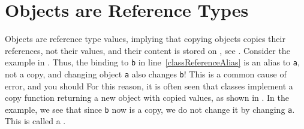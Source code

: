 \documentclass[fsharpNotes.tex]{subfiles}
\begin{document}

\clearpage

\section{Objects are Reference Types}
Objects are reference type values, implying that copying objects copies their references, not their values, and their content is stored on , see . Consider the example in .
 Thus, the binding to \lstinline{b} in line~\ref{classReferenceAlias} is an alias to \lstinline{a}, not a copy, and changing object \lstinline{a} also changes \lstinline{b}! This is a common cause of error, and you should  For this reason, it is often seen that classes implement a copy function returning a new object with copied values, as shown in .
 In the example, we see that since \lstinline{b} now is a copy, we do not change it by changing \lstinline{a}. This is called a .
%
%
%
%
\end{document}
